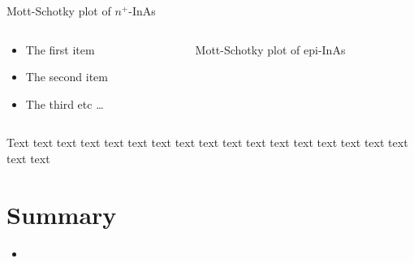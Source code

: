\documentclass[final]{beamer}
\begin{document}
\begin{poster}
\begin{columns}[c]
    \begin{column}{0.65\columnwidth}
       \centering
       
       \caption{Mott-Schotky plot of $n^+\!$-InAs}  
    \end{column}
   \end{columns}
   
\begin{columns}[c]
    \begin{column}{0.35\columnwidth}
        \begin{itemize}    \itemsep-12pt          
            \item The first item
            \item The second item
            \item The third etc \ldots
           \end{itemize}
          \end{column}
          
          \begin{column}{0.65\columnwidth}
              \centering
              
              \caption{Mott-Schotky plot of epi-InAs}  
             \end{column}
   \end{columns}	

Text text text text text text text text text text
text text text text text text text text text

\section{Summary} \justifying
    \begin{itemize} \itemsep12pt
        \justifying
        \item     
    \end{itemize}


\end{poster}
\end{document}
